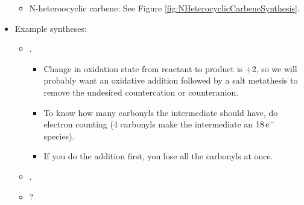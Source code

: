 \documentclass[../notes.tex]{subfiles}
\begin{document}
\begin{itemize}
\begin{itemize}
\begin{itemize}
        \end{itemize}
        \item N-heteroocyclic carbene: See Figure \ref{fig:NHeterocyclicCarbeneSynthesis}.
    \end{itemize}
    \item Example syntheses:
    \begin{itemize}
        \item {}.
        \begin{itemize}
            \item Change in oxidation state from reactant to product is $+2$, so we will probably want an oxidative addition followed by a salt metathesis to remove the undesired countercation or counteranion.
            \item To know how many carbonyls the intermediate should have, do electron counting (4 carbonyls make the intermediate an $18\,\e[-]$ species).
            \item If you do the  addition first, you lose all the carbonyls at once.
        \end{itemize}
        \item {}.
        \item {}?
    \end{itemize}
\end{itemize}
\end{document}
